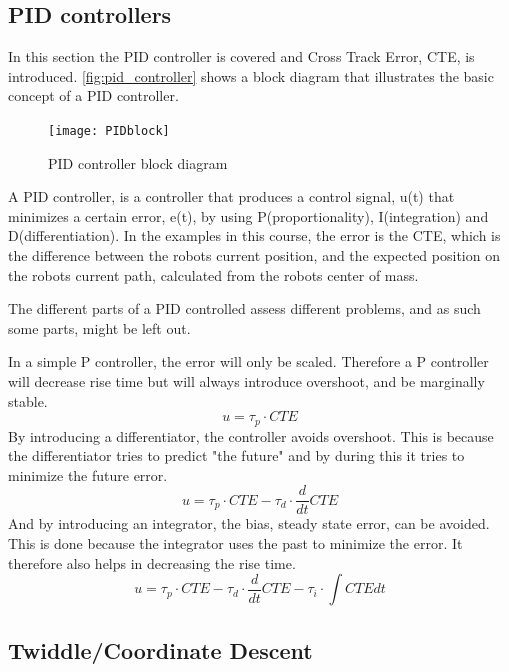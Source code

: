 \documentclass[Main]{subfiles}
\begin{document}
\subsection{PID controllers}
In this section the PID controller is covered and Cross Track Error, CTE, is introduced.
\autoref{fig:pid_controller} shows a block diagram that illustrates the basic concept of a PID controller.
\begin{figure}[H]
	\centering
	\texttt{[image: PIDblock]}
	\caption{PID controller block diagram}
	\label{fig:pid_controller}
\end{figure}\noindent
A PID controller, is a controller that produces a control signal, u(t)  that minimizes a certain error, e(t), by using P(proportionality), I(integration) and D(differentiation). 
In the examples in this course, the error is the CTE, which is the difference between the robots current position, and the expected position on the robots current path, calculated from the robots center of mass.

The different parts of a PID controlled assess different problems, and as such some parts, might be left out.

In a simple P controller, the error will only be scaled. 
Therefore a P controller will decrease rise time but will always introduce overshoot, and be marginally stable.
\begin{equation}
	u = \tau_p \cdot CTE
\end{equation}
By introducing a differentiator, the controller avoids overshoot.
This is because the differentiator tries to predict "the future"  and by during this it tries to minimize the future error.
\begin{equation}
	u = \tau_p \cdot CTE - \tau_d \cdot \frac{d}{dt} CTE
\end{equation}
And by introducing an integrator, the bias, steady state error, can be avoided.
This is done because the integrator uses the past  to minimize the error.
It therefore also helps in decreasing the rise time.
\begin{equation}
	u = \tau_p \cdot CTE - \tau_d \cdot \frac{d}{dt} CTE - \tau_i \cdot \int CTE dt
\end{equation}

\subsection{Twiddle/Coordinate Descent}
\end{document}
